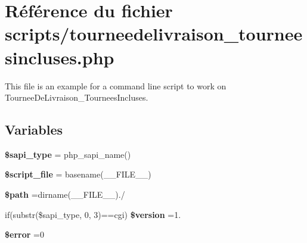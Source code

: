 \hypertarget{tourneedelivraison__tourneesincluses_8php}{}\section{Référence du fichier scripts/tourneedelivraison\+\_\+tourneesincluses.php}
\label{tourneedelivraison__tourneesincluses_8php}


This file is an example for a command line script to work on Tournee\+De\+Livraison\+\_\+\+Tournees\+Incluses.  


\subsection*{Variables}
\begin{DoxyCompactItemize}
\item 
\mbox{\label{tourneedelivraison__tourneesincluses_8php_a86e02f00a36d0fcbf274de973b2640d0}} 
{\bfseries \$sapi\+\_\+type} = php\+\_\+sapi\+\_\+name()
\item 
\mbox{\label{tourneedelivraison__tourneesincluses_8php_a97b9f047572d6c50f29fbea522f6c17e}} 
{\bfseries \$script\+\_\+file} = basename(\+\_\+\+\_\+\+F\+I\+L\+E\+\_\+\+\_\+)
\item 
\mbox{\label{tourneedelivraison__tourneesincluses_8php_a0a4baf0b22973c07685c3981f0d17fc4}} 
{\bfseries \$path} =dirname(\+\_\+\+\_\+\+F\+I\+L\+E\+\_\+\+\_\+).\textquotesingle{}/\textquotesingle{}
\item 
\mbox{\label{tourneedelivraison__tourneesincluses_8php_a0a351317886caa2358df1658880c0c78}} 
if(substr(\$sapi\+\_\+type, 0, 3)==\textquotesingle{}cgi\textquotesingle{}) {\bfseries \$version} =\textquotesingle{}1.\textquotesingle{}
\item 
\mbox{\label{tourneedelivraison__tourneesincluses_8php_aeba2ab722cedda53dbb7ec1a59f45550}} 
{\bfseries \$error} =0
\item 
\mbox{\label{tourneedelivraison__tourneesincluses_8php_a2b87986264c1ca3cddb96a106af7b37a}} 

\end{DoxyCompactItemize}
